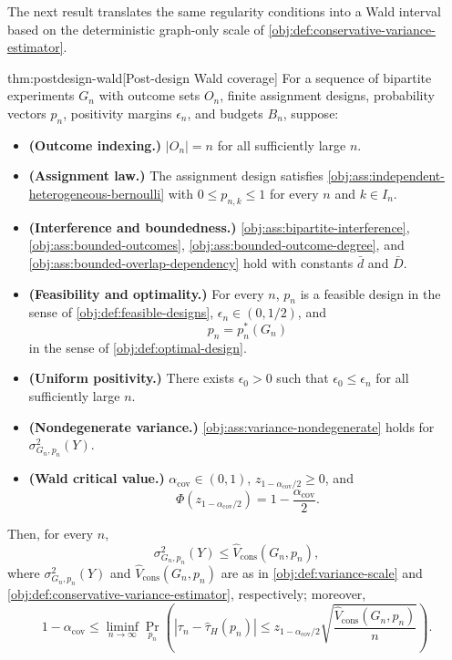 \documentclass[11pt]{article}
\begin{document}
The next result translates the same regularity conditions into a Wald interval based on the deterministic graph-only scale of \cref{obj:def:conservative-variance-estimator}.

\begin{theoremv}{thm:postdesign-wald}[Post-design Wald coverage]
For a sequence of bipartite experiments $G_n$ with outcome sets $O_n$, finite assignment designs, probability vectors $p_n$, positivity margins $\epsilon_n$, and budgets $B_n$, suppose:
\begin{itemize}
\item \textbf{(Outcome indexing.)} $|O_n|=n$ for all sufficiently large $n$.
\item \textbf{(Assignment law.)} The assignment design satisfies \cref{obj:ass:independent-heterogeneous-bernoulli} with $0\le p_{n,k}\le 1$ for every $n$ and $k\in I_n$.
\item \textbf{(Interference and boundedness.)} \cref{obj:ass:bipartite-interference}, \cref{obj:ass:bounded-outcomes}, \cref{obj:ass:bounded-outcome-degree}, and \cref{obj:ass:bounded-overlap-dependency} hold with constants $\bar d$ and $\bar D$.
\item \textbf{(Feasibility and optimality.)} For every $n$, $p_n$ is a feasible design in the sense of \cref{obj:def:feasible-designs}, $\epsilon_n\in(0,1/2)$, and
\[
p_n=p_n^*(G_n)
\]
in the sense of \cref{obj:def:optimal-design}.
\item \textbf{(Uniform positivity.)} There exists $\epsilon_0>0$ such that $\epsilon_0\le\epsilon_n$ for all sufficiently large $n$.
\item \textbf{(Nondegenerate variance.)} \cref{obj:ass:variance-nondegenerate} holds for $\sigma^2_{G_n,p_n}(Y)$.
\item \textbf{(Wald critical value.)} $\alpha_{\mathrm{cov}}\in(0,1)$, $z_{1-\alpha_{\mathrm{cov}}/2}\ge0$, and
\[
\Phi\!\left(z_{1-\alpha_{\mathrm{cov}}/2}\right)
=1-\frac{\alpha_{\mathrm{cov}}}{2}.
\]
\end{itemize}
Then, for every $n$,
\[
\sigma^2_{G_n,p_n}(Y)\le \widehat V_{\mathrm{cons}}(G_n,p_n),
\]
where $\sigma^2_{G_n,p_n}(Y)$ and $\widehat V_{\mathrm{cons}}(G_n,p_n)$ are as in \cref{obj:def:variance-scale} and \cref{obj:def:conservative-variance-estimator}, respectively; moreover,
\[
1-\alpha_{\mathrm{cov}}
\le
\liminf_{n\to\infty}
\Pr_{p_n}\!\left(
\left|\tau_n-\widehat\tau_H(p_n)\right|
\le
z_{1-\alpha_{\mathrm{cov}}/2}
\sqrt{\frac{\widehat V_{\mathrm{cons}}(G_n,p_n)}{n}}
\right).
\]
\end{theoremv}
\end{document}
